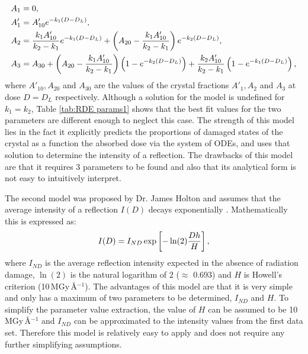 \begin{subequations}
\begin{align}
A_1  &= 0, \\
A'_1 &= A'_{10} e^{-k_1 (D - D_L)}, \\
A_2  &= \frac{k_1 A'_{10}}{k_2 - k_1} e^{-k_1 (D - D_L)} + \left(A_{20} - \frac{k_1 A'_{10}}{k_2 - k_1} \right) e^{-k_2 (D - D_L)}, \\
A_3  &= A_{30} + \left(A_{20} - \frac{k_1 A'_{10}}{k_2 - k_1}\right) \left(1 - e^{-k_2(D-D_L)}\right) + \frac{k_2 A'_{10}}{k_2 - k_1} \left(1 - e^{-k_1 (D - D_L)}\right),
\end{align}
\label{eq:Sygusch and Allaire ODE solution - set 2}
\end{subequations}
where $A'_{10}, A_{20}$ and $A_{30}$ are the values of the crystal fractions $A'_{1}, A_{2}$ and $A_{3}$ at dose $D = D_L$ respectively.
Although a solution for the model is undefined for $k_1 = k_2$, Table \ref{tab:RDE params1} shows that the best fit values for the two parameters are different enough to neglect this case. \newline
The strength of this model lies in the fact it explicitly predicts the proportions of damaged states of the crystal as a function the absorbed dose via the system of ODEs, and uses that solution to determine the intensity of a reflection.
The drawbacks of this model are that it requires 3 parameters to be found and also that its analytical form is not easy to intuitively interpret.

The second model was proposed by Dr. James Holton and assumes that the average intensity of a reflection $I(D)$ decays exponentially \cite{holton2010}. Mathematically this is expressed as:
\begin{equation}
I(D) = I_{ND} \exp \left[ -\ln(2) \frac{Dh}{H} \right],
\label{eq:Holton DDM}
\end{equation}
where $I_{ND}$ is the average reflection intensity expected in the absence of radiation damage, $\ln(\text{2})$ is the natural logarithm of 2 ($\approx$ 0.693) and $H$ is Howell's criterion (10$\, $MGy$\,$\AA$^{-1}$).
The advantages of this model are that it is very simple and only has a maximum of two parameters to be determined, $I_{ND}$ and $H$.
To simplify the parameter value extraction, the value of $H$ can be assumed to be 10$\,$MGy$\,$\AA$^{-\text{1}}$ and $I_{ND}$ can be approximated to the intensity values from the first data set.
Therefore this model is relatively easy to apply and does not require any further simplifying assumptions.

